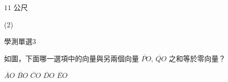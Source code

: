 \begin{QUESTIONS}
\begin{QUESTION}
\begin{QBODY}
\begin{QOPS}
                \QOP $11$ 公尺
            \end{QOPS}
        \end{QBODY}
        \begin{QFROMS}
        \end{QFROMS}
        \begin{QTAGS}\end{QTAGS}
        \begin{QANS}
            (2)
        \end{QANS}
        \begin{QSOLLIST}
        \end{QSOLLIST}
        \begin{QEMPTYSPACE}
        \end{QEMPTYSPACE}
    \end{QUESTION}
    \begin{QUESTION}
        \begin{ExamInfo}{91}{學測}{單選}{3}
        \end{ExamInfo}
        \begin{ExamAnsRateInfo}{62}{94}{65}{27}
        \end{ExamAnsRateInfo}
        \begin{QBODY}
            如圖，下面哪一選項中的向量與另兩個向量 $\lvec{PO}$, $\lvec{QO}$ 之和等於零向量？
            \begin{QOPS} 
                \QOP $\lvec{AO}$ 
                \QOP $\lvec{BO}$ 
                \QOP $\lvec{CO}$ 
                \QOP $\lvec{DO}$ 
                \QOP $\lvec{EO}$ 
            \end{QOPS}


\end{QBODY}
\end{QUESTION}
\end{QUESTIONS}
